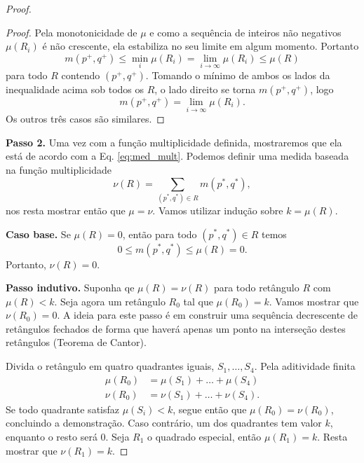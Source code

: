 \begin{proof}
\begin{proof}
    Pela monotonicidade de $\mu$ e como a sequência de inteiros não negativos $\mu(R_i)$ é não 
    crescente, ela estabiliza no seu limite em algum momento. Portanto
    \begin{equation*}
        m(p^+, q^+) \leq \min_i\mu(R_i) = \lim_{i\to\infty} \mu(R_i) \leq \mu(R)
    \end{equation*}
    para todo $R$ contendo $(p^+, q^+)$. Tomando o mínimo de ambos os lados da inequalidade acima 
    sob todos os $R$, o lado direito se torna $m(p^+, q^+)$, logo
    \begin{equation*}
        m(p^+, q^+) = \lim_{i\to\infty}\mu(R_i).
    \end{equation*}
    Os outros três casos são similares. 
\end{proof} 

\textbf{Passo 2.} Uma vez com a função multiplicidade definida, mostraremos que ela está de acordo com a 
Eq. \eqref{eq:med_mult}. Podemos definir uma medida baseada na função multiplicidade
\begin{equation*}
    \nu(R) = \sum_{(p^*, q^*)\in R} m(p^*, q^*),
\end{equation*}
nos resta mostrar então que $\mu = \nu$. Vamos utilizar indução sobre $k = \mu(R)$. 

\noindent \textbf{Caso base.} Se $\mu(R) = 0$, então para todo $(p^*, q^*) \in R$ temos 
\begin{equation*}
    0 \leq m(p^*, q^*) \leq \mu(R) = 0.
\end{equation*}
Portanto, $\nu(R) = 0$. 

\noindent \textbf{Passo indutivo.} Suponha qe $\mu(R) = \nu(R)$ para todo retângulo $R$ com 
$\mu(R) < k$. Seja agora um retângulo $R_0$ tal que $\mu(R_0) = k$. Vamos mostrar que $\nu(R_0)
=0$. A ideia para este passo é em construir uma sequência decrescente de retângulos fechados 
de forma que haverá apenas um ponto na interseção destes retângulos (Teorema de Cantor). 

Divida o retângulo em quatro quadrantes iguais, $S_1, \dots, S_4$. Pela aditividade finita
\begin{align*}
    \mu(R_0) & = \mu(S_1) + \dots + \mu(S_4) \\
    \nu(R_0) & = \nu(S_1) + \dots + \nu(S_4).
\end{align*}
Se todo quadrante satisfaz $\mu(S_i) < k$, segue então que $\mu(R_0) = \nu(R_0)$, concluindo
a demonstração. Caso contrário, um dos quadrantes tem valor $k$, enquanto o resto será $0$. 
Seja $R_1$ o quadrado especial, então $\mu(R_1) = k$. Resta mostrar que $\nu(R_1) = k$. 


\end{proof}
